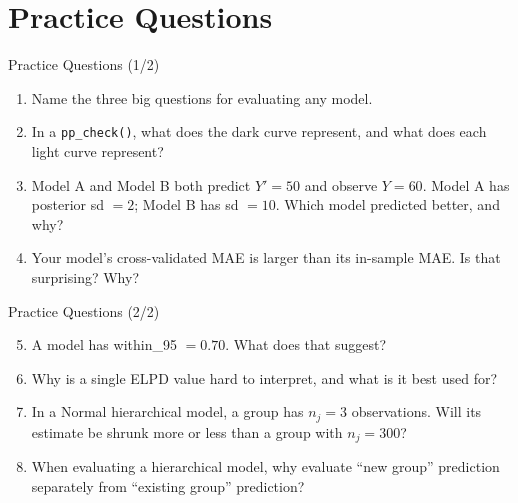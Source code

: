\documentclass[aspectratio=43,11pt]{beamer}
\begin{document}
\section{Practice Questions}

\begin{frame}{Practice Questions (1/2)}
  \begin{enumerate}
    \item Name the three big questions for evaluating any model.
    \vspace{0.6em}
    \item In a \texttt{pp\_check()}, what does the dark curve represent, and what does each light curve represent?
    \vspace{0.6em}
    \item Model A and Model B both predict $Y'=50$ and observe $Y=60$. Model A has posterior sd $=2$; Model B has sd $=10$. Which model predicted better, and why?
    \vspace{0.6em}
    \item Your model's cross-validated MAE is larger than its in-sample MAE. Is that surprising? Why?
  \end{enumerate}
\end{frame}

\begin{frame}{Practice Questions (2/2)}
  \begin{enumerate}
    \setcounter{enumi}{4}
    \item A model has within\_95 $=0.70$. What does that suggest?
    \vspace{0.6em}
    \item Why is a single ELPD value hard to interpret, and what is it best used for?
    \vspace{0.6em}
    \item In a Normal hierarchical model, a group has $n_j=3$ observations. Will its estimate be shrunk more or less than a group with $n_j=300$?
    \vspace{0.6em}
    \item When evaluating a hierarchical model, why evaluate ``new group'' prediction separately from ``existing group'' prediction?
  \end{enumerate}
\end{frame}
\end{document}
